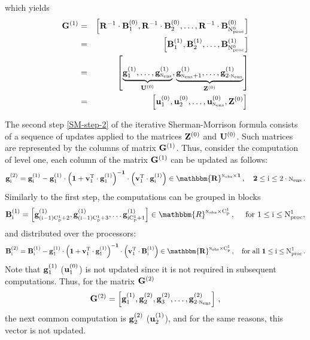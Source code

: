 \documentclass[12pt]{article}
\newcommand{\Nobs}{\textsc{n}_{{\rm obs}}}
\newcommand{\Nens}{\textsc{n}_{{\rm ens}}}
\newcommand{\Nproc}[1]{{\rm N_{proc}^{\rm #1}}}
\newcommand{\nc}[1]{{\rm C_{p}^{\rm #1}}}
\newcommand{\R}{{\bf R}}
\newcommand{\sZ}[1]{{\bf Z}^{\left(\rm #1 \right)}}
\newcommand{\U}[1]{{\bf U}^{\left ( \rm #1 \right)}}
\renewcommand{\u}[2]{{\bf u}_{\rm #1}^{(\rm #2)}}
\renewcommand{\v}[1]{{\bf v}_{{\rm #1}}}
\renewcommand{\Re}{\mathbbm{R}}
\newcommand{\G}[1]{\bf G^{(\rm #1)}}
\newcommand{\gj}[2]{\bf {g_{\rm #1}^{(\rm #2)}}}
\newcommand{\invS}[1]{ {#1^{-1}}}
\newcommand{\Bi}[2]{{\bf B_{\rm #1}^{\rm ( #2 )}}}
\begin{document}
which yields
\begin{eqnarray} \nonumber
\displaystyle \G{1} &=& \left [\invS{\R} \cdot \Bi{1}{0},\invS{\R} \cdot \Bi{2}{0},\ldots,\invS{\R} \cdot \Bi{\Nproc{0}}{0} \right ]  \\ \nonumber
&=& \left [\Bi{1}{1},\Bi{2}{1},\ldots,\Bi{\Nproc{0}}{1} \right ]  \\ \nonumber
 &=& \left [ \underbrace{ \gj{1}{1}, \ldots, \gj{\Nens}{1} }_{\U{0}}, \underbrace{\gj{\Nens+1}{1}, \ldots, \gj{2 \cdot \Nens}{1}}_{\sZ{0}} \right ]  \\
 &=& \left[ \u{1}{0}, \u{2}{0}, \ldots, \u{\Nens}{0} , \sZ{0} \right]\, 
\end{eqnarray}

The second step \eqref{SM-step-2} of the iterative Sherman-Morrison formula consists of a sequence of updates applied to the matrices $\sZ{0}$ and $\U{0}$. Such matrices are represented by the columns of matrix $\G{1}$. Thus, consider the computation of level one, each column of the matrix $\G{1}$ can be updated as follows:
\begin{eqnarray} \nonumber
\displaystyle 
\gj{i}{2} = \gj{i}{1}-\gj{1}{1} \cdot \left (1+\v{1}^{\rm T} \cdot \gj{1}{1} \right )^{-1} \cdot \left( \v{1}^{\rm T} \cdot \gj{i}{1} \right ) \in \Re^{\Nobs \times 1}\,,
\quad 2 \le \rm i \le 2 \cdot \Nens\,.
\end{eqnarray}
Similarly to the first step, the computations can be grouped in blocks
\begin{eqnarray} \nonumber
\displaystyle 
\Bi{i}{1} = \left[ \gj{(i-1)\nc{1}+2}{1}, \gj{(i-1)\nc{1}+3}{1}, \ldots \gj{i\nc{1}+1}{1} \right ] \in \Re^{\Nobs \times \nc{1}}\,,\quad \text{ for  $1 \le {\rm i} \le \Nproc{1}$},
\end{eqnarray}
and distributed over the processors:
\begin{eqnarray} \nonumber
\displaystyle 
\Bi{i}{2} = \Bi{i}{1}-\gj{1}{1} \cdot \left (1+\v{1}^{\rm T} \cdot \gj{1}{1} \right )^{-1} \cdot \left( \v{1}^{\rm T} \cdot \Bi{i}{1} \right ) \in \Re^{\Nobs \times \nc{1}}\,,
\quad \mbox{for all }1 \le \rm i \le \Nproc{1}\,.
\end{eqnarray}
Note that $\gj{1}{1}$ ($\u{1}{0}$) is not updated since it is not required in subsequent computations. 
Thus, for the matrix $\G{2}$
\begin{eqnarray} \nonumber
\displaystyle 
\G{2} = \left[ \gj{1}{1}, \gj{2}{2}, \gj{3}{2}, \ldots, \gj{2 \cdot \Nens}{2}\right ]\, ,
\end{eqnarray}
the next common computation is $\gj{2}{2}$ ($\u{2}{1}$), and for the same reasons, this vector is not updated. 
\end{document}
